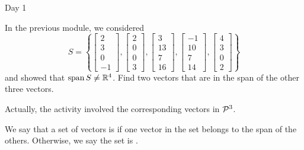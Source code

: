 
\begin{applicationActivities}{Day 1}

\begin{activity}{15}
  In the previous module, we considered
  \[S=\left\{
  \begin{bmatrix}2\\3\\0\\-1\end{bmatrix},
  \begin{bmatrix}2\\0\\0\\3\end{bmatrix},
  \begin{bmatrix}3\\13\\7\\16\end{bmatrix},
  \begin{bmatrix}-1\\10\\7\\14\end{bmatrix},
  \begin{bmatrix}4\\3\\0\\2\end{bmatrix}
  \right\}
  \]
  and showed that \(\vspan S\not=\IR^4\). Find two vectors that
  are in the span of the other three vectors.

  \begin{TBLnote}
    Actually, the activity involved the corresponding vectors in \(\P^3\).
  \end{TBLnote}
\end{activity}

\begin{definition}
  We say that a set of vectors is  if one vector
  in the set belongs to the span of the others. Otherwise, we say the set
  is .
\end{definition}

\end{applicationActivities}
